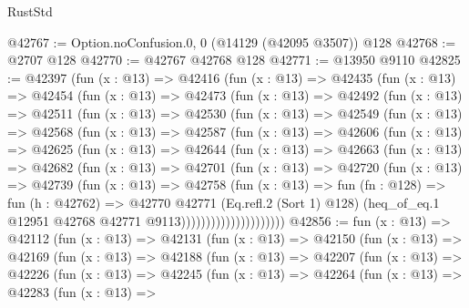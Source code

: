 \begin{lexlean}{RustStd}
\begin{coremodule}
@42767 := Option.noConfusion.{0, 0} (@14129 (@42095 @3507)) @128
@42768 := @2707 @128
@42770 := @42767 @42768 @128
@42771 := @13950 @9110
@42825 := @42397
    (fun (x : @13) =>
    @42416
      (fun (x : @13) =>
      @42435
        (fun (x : @13) =>
        @42454
          (fun (x : @13) =>
          @42473
            (fun (x : @13) =>
            @42492
              (fun (x : @13) =>
              @42511
                (fun (x : @13) =>
                @42530
                  (fun (x : @13) =>
                  @42549
                    (fun (x : @13) =>
                    @42568
                      (fun (x : @13) =>
                      @42587
                        (fun (x : @13) =>
                        @42606
                          (fun (x : @13) =>
                          @42625
                            (fun (x : @13) =>
                            @42644
                              (fun (x : @13) =>
                              @42663
                                (fun (x : @13) =>
                                @42682
                                  (fun (x : @13) =>
                                  @42701
                                    (fun (x : @13) =>
                                    @42720
                                      (fun (x : @13) =>
                                      @42739
                                        (fun (x : @13) =>
                                        @42758
                                          (fun (x : @13) =>
                                          fun (fn : @128) =>
                                          fun (h : @42762) =>
                                          @42770
                                            @42771
                                            (Eq.refl.{2} (Sort 1) @128)
                                            (heq_of_eq.{1}
                                              @12951
                                              @42768
                                              @42771
                                              @9113)))))))))))))))))))))
@42856 := fun (x : @13) =>
  @42112
    (fun (x : @13) =>
    @42131
      (fun (x : @13) =>
      @42150
        (fun (x : @13) =>
        @42169
          (fun (x : @13) =>
          @42188
            (fun (x : @13) =>
            @42207
              (fun (x : @13) =>
              @42226
                (fun (x : @13) =>
                @42245
                  (fun (x : @13) =>
                  @42264
                    (fun (x : @13) =>
                    @42283
                      (fun (x : @13) =>

\end{coremodule}
\end{lexlean}
